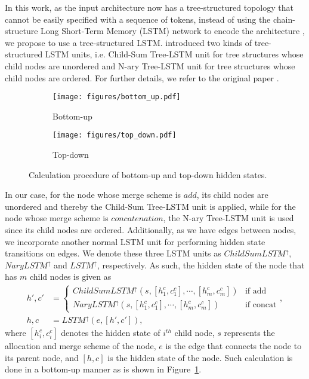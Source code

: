 \documentclass{article}
\begin{document}
In this work, as the input architecture now has a tree-structured topology that cannot be easily specified with a sequence of tokens, 
instead of using the chain-structure Long Short-Term Memory (LSTM) network \cite{hochreiter1997long} to encode the architecture \cite{zoph2017learning}, we propose to use a tree-structured LSTM. \citet{tai2015improved} introduced two kinds of tree-structured LSTM units, i.e. Child-Sum Tree-LSTM unit for tree structures whose child nodes are unordered and N-ary Tree-LSTM unit for tree structures whose child nodes are ordered. For further details, we refer to the original paper \cite{tai2015improved}.

\begin{figure}[t]
	\centering
\begin{subfigure}{0.46\linewidth}
		\centering
		\texttt{[image: figures/bottom\_up.pdf]}
		\vspace{-2pt}
		\caption{Bottom-up}
		\label{fig:encoder_bottom_up}
		\vspace{-0pt}
	\end{subfigure}
	\hfill
	\begin{subfigure}{0.46\linewidth}
		\centering
		\texttt{[image: figures/top\_down.pdf]}
		\vspace{-2pt}
		\caption{Top-down}
		\label{fig:encoder_top_down}
		\vspace{-0pt}
	\end{subfigure}	
	\caption{Calculation procedure of bottom-up and top-down hidden states.}
	\label{fig:tree_encoder}
\end{figure}

In our case, for the node whose merge scheme is $add$, its child nodes are unordered and thereby the Child-Sum Tree-LSTM unit is applied, while for the node whose merge scheme is $concatenation$, the N-ary Tree-LSTM unit is used since its child nodes are ordered. Additionally, as we have edges between nodes, we incorporate another normal LSTM unit for performing hidden state transitions on edges. We denote these three LSTM units as $ChildSumLSTM^\uparrow$, $NaryLSTM^\uparrow$ and $LSTM^\uparrow$, respectively. As such, the hidden state of the node that has $m$ child nodes is given as
{\small
\begin{align}\label{eq:bottom_up}
	h'\!\!, c' \!\! &= \!\! \begin{cases}
        \! ChildSumLSTM^\uparrow \! (s, [h_1^c, c_1^c], \cdots \!, [h_m^c, c_m^c]) & \!\!\!\! \text{if add} \\
        \! NaryLSTM^\uparrow \! (s, [h_1^c, c_1^c], \cdots \!, [h_m^c, c_m^c]) & \!\!\!\! \text{if concat}
    \end{cases} \! , \nonumber \\
	h, c &= LSTM^\uparrow(e, [h', c']) ,
\end{align}
}where $[h^c_i, c^c_i]$ denotes the hidden state
of $i^{th}$ child node, $s$ represents the allocation and merge scheme of the node, $e$ is the edge that connects the node to its parent node, and $[h, c]$ is the hidden state of the node. Such calculation is done in a bottom-up manner as is shown in Figure~\ref{fig:encoder_bottom_up}.
\end{document}
